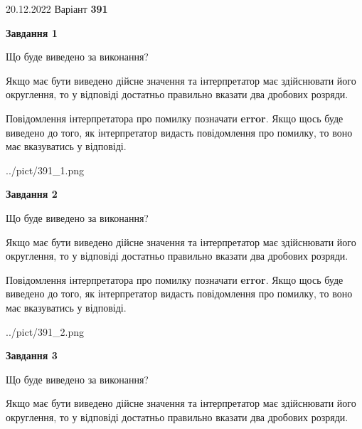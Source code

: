 \documentclass[12pt, ukrainian]{article}
\begin{document}
{20.12.2022 Варіант \No \textbf { 391 }\par}
{
\begin {Large}

{\begin {center}\textbf{Завдання 1}\end {center}}\par
Що буде виведено за виконання? \par

Якщо має бути виведено дійсне значення та інтерпретатор має здійснювати його округлення, 
то у відповіді достатньо правильно вказати два дробових розряди.

Повідомлення інтерпретатора про помилку позначати \textbf{error}.
Якщо щось буде виведено до того, як інтерпретатор видасть повідомлення про помилку, 
то воно має вказуватись у відповіді. \par

\begin{center}
	{../pict/391_1.png}
\end{center}
\newpage

{\begin {center}\textbf{Завдання 2}\end {center}}\par
Що буде виведено за виконання? \par

Якщо має бути виведено дійсне значення та інтерпретатор має здійснювати його округлення, 
то у відповіді достатньо правильно вказати два дробових розряди.

Повідомлення інтерпретатора про помилку позначати \textbf{error}.
Якщо щось буде виведено до того, як інтерпретатор видасть повідомлення про помилку, 
то воно має вказуватись у відповіді. \par

\begin{center}
	{../pict/391_2.png}
\end{center}
\newpage

{\begin {center}\textbf{Завдання 3}\end {center}}\par
Що буде виведено за виконання? \par

Якщо має бути виведено дійсне значення та інтерпретатор має здійснювати його округлення, 
то у відповіді достатньо правильно вказати два дробових розряди.


\end{Large}}
\end{document}
